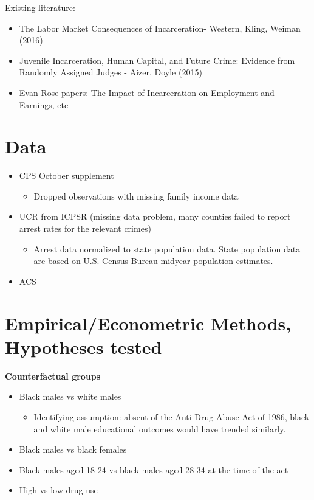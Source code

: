 \documentclass{article}
\begin{document}
Existing literature:
\begin{itemize}[itemsep=0.05mm, parsep=0pt]
  \item The Labor Market Consequences of Incarceration- Western, Kling, Weiman (2016)
  \item Juvenile Incarceration, Human Capital, and Future Crime: Evidence from Randomly Assigned Judges - Aizer, Doyle (2015)
  \item Evan Rose papers: The Impact of Incarceration on Employment and Earnings, etc
\end{itemize}


\section*{Data}

\begin{itemize}[itemsep=0.05mm, parsep=0pt]
  \item CPS October supplement
  \begin{itemize}
    \item Dropped observations with missing family income data
  \end{itemize}
  \item UCR from ICPSR (missing data problem, many counties failed to report arrest rates for the relevant crimes)
  \begin{itemize}
    \item Arrest data normalized to state population data. State population data are based on U.S. Census Bureau midyear population estimates.
  \end{itemize}
  \item ACS
\end{itemize}

\section*{Empirical/Econometric Methods, Hypotheses tested}


\textbf{Counterfactual groups}
\begin{itemize}[itemsep=0.05mm, parsep=0pt]
  \item Black males vs white males
  \begin{itemize}
    \item Identifying assumption: absent of the Anti-Drug Abuse Act of 1986, black and white male educational outcomes would have trended similarly.
  \end{itemize}
  \item Black males vs black females
  \item Black males aged 18-24 vs black males aged 28-34 at the time of the act
  \item High vs low drug use
\end{itemize}
\end{document}

